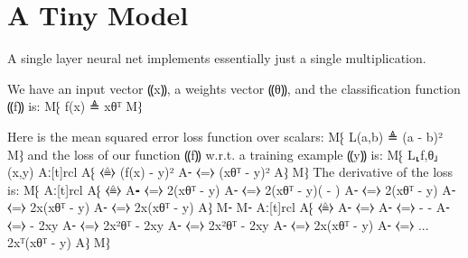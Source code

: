 \documentclass{article}
\begin{document}
\section{A Tiny Model}

A single layer neural net implements essentially just a single multiplication.

We have an input vector ⸨x⸩, a weights vector ⸨θ⸩, and the
classification function ⸨f⸩ is:
M⁅ f(x) ≜ xθᵀ M⁆

Here is the mean squared error loss function over scalars:
M⁅ L(a,b) ≜ (a - b)² M⁆
and the loss of our function ⸨f⸩ {w.r.t.} a training example ⸨y⸩ is:
M⁅ L⸤f,θ⸥(x,y) Aː[t]rcl
               A⁅ ⧼≜⧽ (f(x) - y)² 
               A⁃ ⧼=⧽ (xθᵀ - y)²
               A⁆
M⁆
The derivative of the loss is:
M⁅  Aː[t]rcl
                           A⁅ ⧼≜⧽ 
                           A⁃ ⧼=⧽ 2(xθᵀ - y)
                           A⁃ ⧼=⧽ 2(xθᵀ - y)( - )
                           A⁃ ⧼=⧽ 2(xθᵀ - y)
                           A⁃ ⧼=⧽ 2x(xθᵀ - y)
                           A⁃ ⧼=⧽ 2x(xθᵀ - y)
                           A⁆
M⁃
M⁃  Aː[t]rcl
                           A⁅ ⧼≜⧽ 
                           A⁃ ⧼=⧽ 
                           A⁃ ⧼=⧽  -  - 
                           A⁃ ⧼=⧽  - 2xy
                           A⁃ ⧼=⧽ 2x²θᵀ - 2xy
                           A⁃ ⧼=⧽ 2x²θᵀ - 2xy
                           A⁃ ⧼=⧽ 2x(xθᵀ - y)
                           A⁃ ⧼=⧽ ... 2xᵀ(xθᵀ - y)
                           A⁆
M⁆
\end{document}
